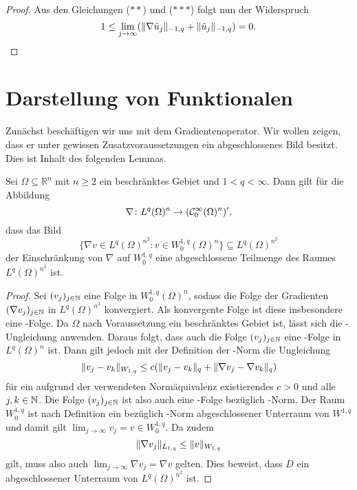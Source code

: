 \begin{proof}
  Aus den Gleichungen ($\ast\ast$) und ($\ast\ast\ast$) folgt nun der Widerspruch
  \begin{displaymath}
  1 \leq \lim_{j \to \infty} ( \lVert \nabla \tilde u_j  \rVert_{-1,q} + \lVert \tilde u_j \rVert_{-1,q} ) = 0.\qedhere
  \end{displaymath}
  

\end{proof}

\section{Darstellung von Funktionalen}

Zunächst beschäftigen wir uns mit dem Gradientenoperator.
Wir wollen zeigen, dass er unter gewissen Zusatzvoraussetzungen ein abgeschlossenes Bild besitzt.
Dies ist Inhalt des folgenden Lemmas.

\begin{lem}
  \label{lem:closedImageGradient}
  Sei $\Omega \subseteq \mathbb{R}^n$ mit $n \geq 2$ ein beschränktes Gebiet und $1 < q < \infty$.
  Dann gilt für die Abbildung
  $$
  \nabla \colon L^{q}(\Omega)^{n} \to (\mathcal{C}_0^\infty(\Omega)^n)',
  $$
  dass das Bild
  $$
  \{\nabla v \in L^{q}(\Omega)^{n^2} \colon v \in W_0^{1,q}(\Omega)^n\} \subseteq L^{q}(\Omega)^{n^2}
  $$
  der Einschränkung von $\nabla$ auf $W_0^{1,q}$ eine abgeschlossene Teilmenge des Raumes $L^q(\Omega)^{n^2}$ ist.
\end{lem}

\begin{proof}
  Sei $(v_j)_{j \in \mathbb{N}}$ eine Folge in $W_0^{1,q}(\Omega)^n$, sodass die Folge der Gradienten $(\nabla v_j)_{j \in \mathbb{N}}$ in $L^q(\Omega)^{n^2}$ konvergiert.
  Als konvergente Folge ist diese insbesondere eine \cauchy\hyp{}Folge.
  Da $\Omega$ nach Voraussetzung ein beschränktes Gebiet ist, lässt sich die \poincare\hyp{}Ungleichung anwenden.
  Daraus folgt, dass auch die Folge $(v_j)_{j \in \mathbb{N}}$ eine \cauchy\hyp{}Folge in $L^q(\Omega)^n$ ist.
  Dann gilt jedoch mit der Definition der \sobolev\hyp{}Norm die Ungleichung
  $$
  \lVert v_j - v_k \rVert_{W_{1,q}} \leq c (\lVert v_j - v_k \rVert_q + \lVert \nabla v_j - \nabla v_k \rVert_q)
  $$
  für ein aufgrund der verwendeten Normäquivalenz existierendes $c > 0$ und alle $j,k \in \mathbb{N}$.
  Die Folge $(v_j)_{j \in \mathbb{N}}$ ist also auch eine \cauchy\hyp{}Folge bezüglich \sobolev\hyp{}Norm.
  Der Raum $W_0^{1,q}$ ist nach Definition ein bezüglich \sobolev\hyp{}Norm abgeschlossener Unterraum von $W^{1,q}$ und damit gilt $\lim_{j \to \infty} v_j = v \in W_0^{1,q}$.
  Da zudem
  $$
  \lVert \nabla v_j \rVert_{L_{1,q}} \leq \lVert v \rVert_{W_{1,q}}  
  $$
  gilt, muss also auch $\lim_{j \to \infty} \nabla v_j = \nabla v$ gelten.
  Dies beweist, dass $D$ ein abgeschlossener Unterraum von $L^q(\Omega)^{n^2}$ ist.
\end{proof}

